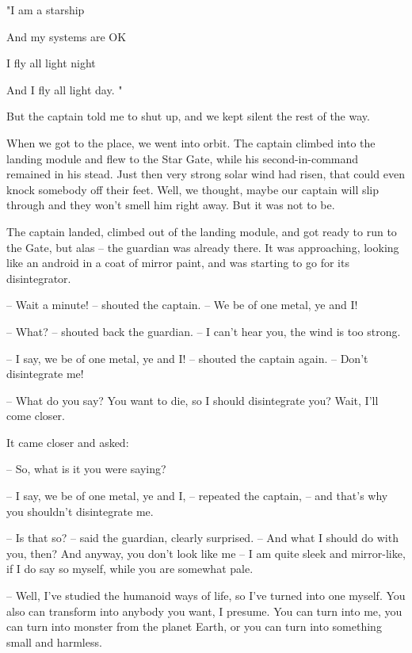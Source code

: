 \documentclass[ebook,twoside,final,openright]{memoir}
\begin{document}
"I am a starship \par
 And my systems are OK \par
 I fly all light night \par
 And I fly all light day. "\par
 But the captain told me to shut up, and we kept silent the rest of the way.\par
\par
When we got to the place, we went into orbit. The captain climbed into the landing module and flew to the Star Gate, while his second-in-command remained in his stead. Just then very strong solar wind had risen, that could even knock somebody off their feet. Well, we thought, maybe our captain will slip through and they won’t smell him right away. But it was not to be.\par
\par
The captain landed, climbed out of the landing module, and got ready to run to the Gate, but alas – the guardian was already there. It was approaching, looking like an android in a coat of mirror paint, and was starting to go for its disintegrator.\par
– Wait a minute! – shouted the captain. – We be of one metal, ye and I!\par
– What? – shouted back the guardian. – I can’t hear you, the wind is too strong.\par
– I say, we be of one metal, ye and I! – shouted the captain again. – Don’t disintegrate me!\par
– What do you say? You want to die, so I should disintegrate you? Wait, I'll come closer.\par
\par
It came closer and asked:\par
– So, what is it you were saying?\par
– I say, we be of one metal, ye and I, – repeated the captain, – and that’s why you shouldn’t disintegrate me.\par
– Is that so? – said the guardian, clearly surprised. – And what I should do with you, then? And anyway, you don’t look like me – I am quite sleek and mirror-like, if I do say so myself, while you are somewhat pale.\par
– Well, I've studied the humanoid ways of life, so I’ve turned into one myself. You also can transform into anybody you want, I presume. You can turn into me, you can turn into monster from the planet Earth, or you can turn into something small and harmless.\par
\end{document}
